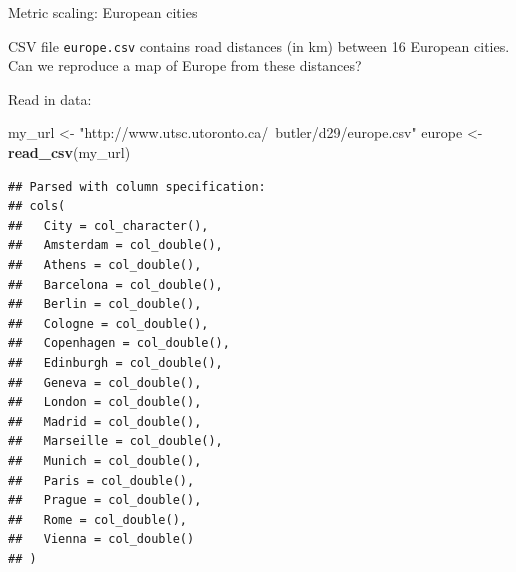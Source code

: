 \documentclass[ignorenonframetext,]{beamer}
\newenvironment{Shaded}{\begin{snugshade}}{\end{snugshade}}
\newcommand{\KeywordTok}[1]{\textcolor[rgb]{0.13,0.29,0.53}{\textbf{#1}}}
\newcommand{\NormalTok}[1]{#1}
\newcommand{\StringTok}[1]{\textcolor[rgb]{0.31,0.60,0.02}{#1}}
\begin{document}
\begin{frame}[fragile]{Metric scaling: European cities}
\protect\hypertarget{metric-scaling-european-cities}{}

CSV file \texttt{europe.csv} contains road distances (in km) between 16
European cities. Can we reproduce a map of Europe from these distances?

Read in data:

\scriptsize

\begin{Shaded}
\begin{Highlighting}[]
\NormalTok{my_url <-}\StringTok{ "http://www.utsc.utoronto.ca/~butler/d29/europe.csv"}
\NormalTok{europe <-}\StringTok{ }\KeywordTok{read_csv}\NormalTok{(my_url)}
\end{Highlighting}
\end{Shaded}

\begin{verbatim}
## Parsed with column specification:
## cols(
##   City = col_character(),
##   Amsterdam = col_double(),
##   Athens = col_double(),
##   Barcelona = col_double(),
##   Berlin = col_double(),
##   Cologne = col_double(),
##   Copenhagen = col_double(),
##   Edinburgh = col_double(),
##   Geneva = col_double(),
##   London = col_double(),
##   Madrid = col_double(),
##   Marseille = col_double(),
##   Munich = col_double(),
##   Paris = col_double(),
##   Prague = col_double(),
##   Rome = col_double(),
##   Vienna = col_double()
## )
\end{verbatim}

\normalsize

\end{frame}
\end{document}
